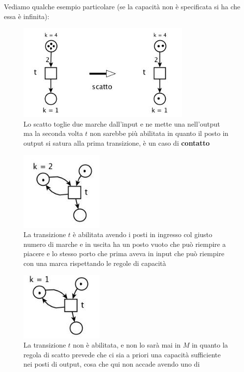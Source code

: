 \documentclass[a4paper,12pt, oneside]{book}
\begin{document}
\begin{esempio}
  Vediamo qualche esempio particolare (se la capacità non è specificata si ha
  che essa è infinita):
  \begin{figure}[H]
    \centering
    \includegraphics[scale = 0.5]{img/pt22.jpg}
    \caption{Lo scatto toglie due marche dall'input e ne mette una nell'output
      ma la seconda volta $t$ non sarebbe più abilitata in quanto il posto in
      output si satura alla prima transizione, è un caso di \textbf{contatto}}
  \end{figure}
  \begin{figure}[H]
    \centering
    \includegraphics[scale = 0.5]{img/pt23.jpg}
    \caption{La transizione $t$ è abilitata avendo i posti in ingresso col
      giusto numero di marche e in uscita ha un posto vuoto che può riempire a
      piacere e lo stesso porto che prima aveva in input che può riempire con
      una marca rispettando le regole di capacità}
  \end{figure}
  \begin{figure}[H]
    \centering
    \includegraphics[scale = 0.5]{img/pt24.jpg}
    \caption{La transizione $t$ non è abilitata, e non lo sarà mai in $M$ in
      quanto la regola di scatto prevede che ci sia a priori una capacità
      sufficiente nei posti di output, cosa che qui non accade avendo uno di
}
\end{figure}
\end{esempio}
\end{document}
